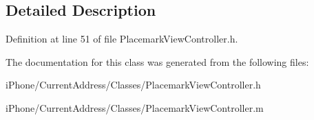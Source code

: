 \subsection{Detailed Description}


Definition at line 51 of file Placemark\-View\-Controller.\-h.



The documentation for this class was generated from the following files\-:\begin{DoxyCompactItemize}
\item 
i\-Phone/\-Current\-Address/\-Classes/Placemark\-View\-Controller.\-h\item 
i\-Phone/\-Current\-Address/\-Classes/Placemark\-View\-Controller.\-m\end{DoxyCompactItemize}
